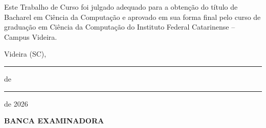\begin{folhadeaprovacao}

  \begin{center}
  \vspace*{-1.2cm}
    \textbf{\large\imprimirautor}

    \vspace*{\fill}\vspace*{\fill}\vspace*{\fill}
    \parbox{15cm}{
        \OnehalfSpacing\centering\large\textbf{\imprimirtitulo}
    }
    \vspace*{\fill}\vspace*{\fill}

    \hspace{.45\textwidth}
    \begin{minipage}{.5\textwidth}
        Este Trabalho de Curso foi julgado
        adequado para a obtenção do título de
        Bacharel em Ciência da Computação e
        aprovado em sua forma final pelo curso de
        graduação em Ciência da Computação do Instituto Federal Catarinense
        -- Campus Videira.
    \end{minipage}%
    \vspace*{\fill}
   \end{center}
    \vspace{-1cm}
  \begin{center}
  	 Videira (SC), \rule{1cm}{0.4pt} de \rule{3cm}{0.4pt} de 2026
  \end{center}


    \begin{center}
  	\textbf{BANCA EXAMINADORA}
   \end{center}

    \vspace*{1cm}

\end{folhadeaprovacao}
